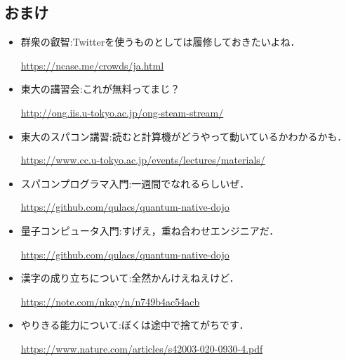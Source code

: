 \documentclass[10pt,twocolumn]{jsarticle}
\begin{document}
\subsection{おまけ}
\begin{itemize}
  \item 群衆の叡智:Twitterを使うものとしては履修しておきたいよね．

  \url{https://ncase.me/crowds/ja.html}

  \item 東大の講習会:これが無料ってまじ？

  \url{http://ong.iis.u-tokyo.ac.jp/ong-steam-stream/}

  \item 東大のスパコン講習:読むと計算機がどうやって動いているかわかるかも．

  \url{https://www.cc.u-tokyo.ac.jp/events/lectures/materials/}

  \item スパコンプログラマ入門:一週間でなれるらしいぜ．

  \url{https://github.com/qulacs/quantum-native-dojo}

  \item 量子コンピュータ入門:すげえ，重ね合わせエンジニアだ．

  \url{https://github.com/qulacs/quantum-native-dojo}

  \item 漢字の成り立ちについて:全然かんけえねえけど．

  \url{https://note.com/nkay/n/n749b4ac54acb}

  \item やりきる能力について:ぼくは途中で捨てがちです．

  \url{https://www.nature.com/articles/s42003-020-0930-4.pdf}
\end{itemize}
\end{document}
